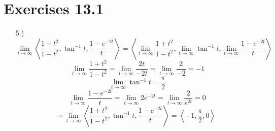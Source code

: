 \documentclass[12pt]{article}
\newcommand{\angleb}[1]{\left\langle#1\right\rangle}
\begin{document}
\pagestyle{fancy}
\fancyhead{}

\normalsize
\section*{Exercises 13.1}
\begin{itemize}
    \item [5.)] \[\lim_{t\to\infty}\angleb{
              \frac{1+t^2}{1-t^2},\tan^{-1}t,\frac{1-e^{-2t}}{t}}=\angleb{\lim_{t\to\infty}\frac{1+t^2}{1-t^2},\lim_{t\to\infty}\tan^{-1}t,\lim_{t\to\infty}\frac{1-e^{-2t}}{t}}\]
          \[\lim_{t\to\infty}\frac{1+t^2}{1-t^2}=\lim_{t\to\infty}\frac{2t}{-2t}=\lim_{t\to\infty}\frac{2}{-2}=-1\]
          \[\lim_{t\to\infty}\tan^{-1}t=\frac{\pi}{2}\]
          \[\lim_{t\to\infty}\frac{1-e^{-2t}}{t}=\lim_{t\to\infty}2e^{-2t}=\lim_{t\to\infty}\frac{2}{e^{2t}}=0\]
          \[\therefore\ \lim_{t\to\infty}\angleb{
              \frac{1+t^2}{1-t^2},\tan^{-1}t,\frac{1-e^{-2t}}{t}}=\angleb{-1,\frac{\pi}{2},0}\]
\end{itemize}
\end{document}
